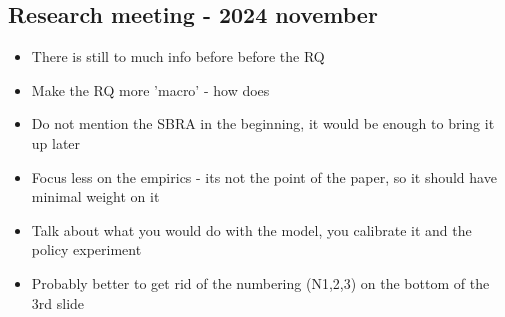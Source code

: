 \documentclass[12pt]{article}
\begin{document}
\subsection*{Research meeting - 2024 november} 
\begin{itemize} \small
    \item There is still to much info before before the RQ
    \item Make the RQ more 'macro' - how does 
    \item Do not mention the SBRA in the beginning, it would be enough to bring it up later
    \item Focus less on the empirics - its not the point of the paper, so it should have minimal weight on it
    \item Talk about what you would do with the model, you calibrate it and the policy experiment
    \item Probably better to get rid of the numbering (N1,2,3) on the bottom of the 3rd slide
\end{itemize}
\end{document}
